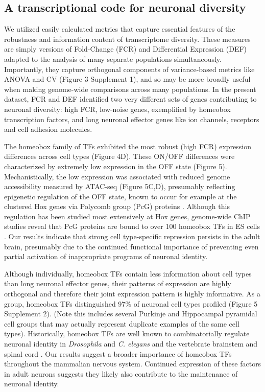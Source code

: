 \subsection{A transcriptional code for neuronal diversity}
We utilized easily calculated metrics that capture essential features of the robustness and information content of transcriptome diversity. These measures are simply versions of Fold-Change (FCR) and Differential Expression (DEF) adapted to the analysis of many separate populations simultaneously. Importantly, they capture orthogonal components of variance-based metrics like ANOVA and CV (Figure 3 Supplement 1), and so may be more broadly useful when making genome-wide comparisons across many populations. In the present dataset, FCR and DEF identified two very different sets of genes contributing to neuronal diversity: high FCR, low-noise genes, exemplified by homeobox transcription factors, and long neuronal effector genes like ion channels, receptors and cell adhesion molecules. 

The homeobox family of TFs exhibited the most robust (high FCR) expression differences across cell types (Figure 4D). These ON/OFF differences were characterized by extremely low expression in the OFF state (Figure 5). Mechanistically, the low expression was associated with reduced genome accessibility measured by ATAC-seq (Figure 5C,D), presumably reflecting epigenetic regulation of the OFF state, known to occur for example at the clustered Hox genes via Polycomb group (PcG) proteins \citep{Montavon_2014}. Although this regulation has been studied most extensively at Hox genes, genome-wide ChIP studies reveal that PcG proteins are bound to over 100 homeobox TFs in ES cells \citep{Boyer_2006}. Our results indicate that strong cell type-specific repression persists in the adult brain, presumably due to the continued functional importance of preventing even partial activation of inappropriate programs of neuronal identity. 

Although individually, homeobox TFs contain less information about cell types than long neuronal effector genes, their patterns of expression are highly orthogonal and therefore their joint expression pattern is highly informative. As a group, homeobox TFs distinguished 97\% of neuronal cell types profiled (Figure 5 Supplement 2). (Note this includes several Purkinje and Hippocampal pyramidal cell groups that may actually represent duplicate examples of the same cell types). Historically, homeobox TFs are well known to combinatorially regulate neuronal identity in \textit{Drosophila} and \textit{C. elegans}  \citep{Kratsios_2017} and the vertebrate brainstem and spinal cord \citep{Dasen_2009,Philippidou_2013}. Our results suggest a broader importance of homeobox TFs throughout the mammalian nervous system. Continued expression of these factors in adult neurons suggests they likely also contribute to the maintenance of neuronal identity.

